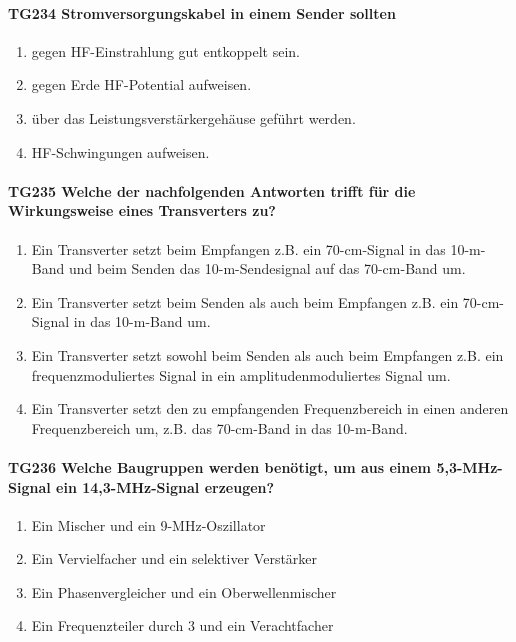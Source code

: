 \documentclass[8pt]{article}
\begin{document}
\paragraph*{TG234 Stromversorgungskabel in einem Sender sollten} 
\begin{enumerate}[nolistsep,label=\Alph*]
\item gegen HF-Einstrahlung gut entkoppelt sein.
\item gegen Erde HF-Potential aufweisen.
\item über das Leistungsverstärkergehäuse geführt werden.
\item HF-Schwingungen aufweisen.
\end{enumerate}

\paragraph*{TG235 Welche der nachfolgenden Antworten trifft für die Wirkungsweise eines Transverters zu?}
\begin{enumerate}[nolistsep,label=\Alph*]
\item Ein Transverter setzt beim Empfangen z.B. ein 70-cm-Signal in das 10-m-Band und beim Senden das 10-m-Sendesignal auf das 70-cm-Band um.
\item Ein Transverter setzt beim Senden als auch beim Empfangen z.B. ein 70-cm-Signal in das 10-m-Band um.
\item Ein Transverter setzt sowohl beim Senden als auch beim Empfangen z.B. ein frequenzmoduliertes Signal in ein amplitudenmoduliertes Signal um.
\item Ein Transverter setzt den zu empfangenden Frequenzbereich in einen anderen Frequenzbereich um, z.B. das 70-cm-Band in das 10-m-Band.
\end{enumerate}

\paragraph*{TG236 Welche Baugruppen werden benötigt, um aus einem 5,3-MHz-Signal ein 14,3-MHz-Signal erzeugen?}
\begin{enumerate}[nolistsep,label=\Alph*]
\item Ein Mischer und ein 9-MHz-Oszillator
\item Ein Vervielfacher und ein selektiver Verstärker
\item Ein Phasenvergleicher und ein Oberwellenmischer
\item Ein Frequenzteiler durch 3 und ein Verachtfacher
\end{enumerate}
\end{document}
